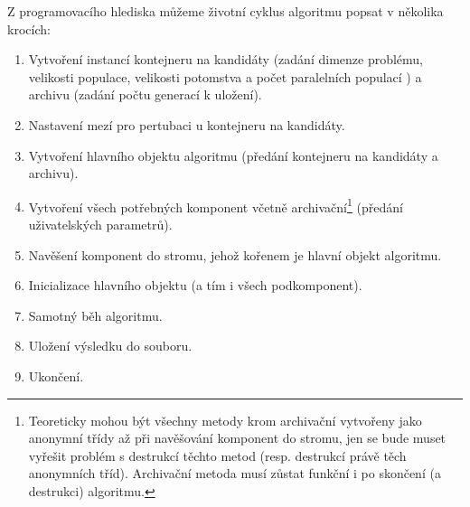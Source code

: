 Z programovacího hlediska můžeme životní cyklus algoritmu popsat v několika krocích:
\begin{enumerate}
  \item Vytvoření instancí kontejneru na kandidáty (zadání dimenze problému, velikosti populace, velikosti potomstva a počet paralelních populací ) a archivu (zadání počtu generací k uložení).
  \item Nastavení mezí pro pertubaci u kontejneru na kandidáty.
  \item Vytvoření hlavního objektu algoritmu (předání kontejneru na kandidáty a archivu).
  \item Vytvoření všech potřebných komponent včetně archivační\footnote{Teoreticky mohou být všechny metody krom archivační vytvořeny jako anonymní třídy až při navěšování komponent do stromu, jen se bude muset vyřešit problém s destrukcí těchto metod (resp. destrukcí právě těch anonymních tříd). Archivační metoda musí zůstat funkční i po skončení (a destrukci) algoritmu.} (předání uživatelských parametrů).
  \item Navěšení komponent do stromu, jehož kořenem je hlavní objekt algoritmu.
  \item Inicializace hlavního objektu (a tím i všech podkomponent).
  \item Samotný běh algoritmu.
  \item Uložení výsledku do souboru.
  \item Ukončení.
\end{enumerate}


